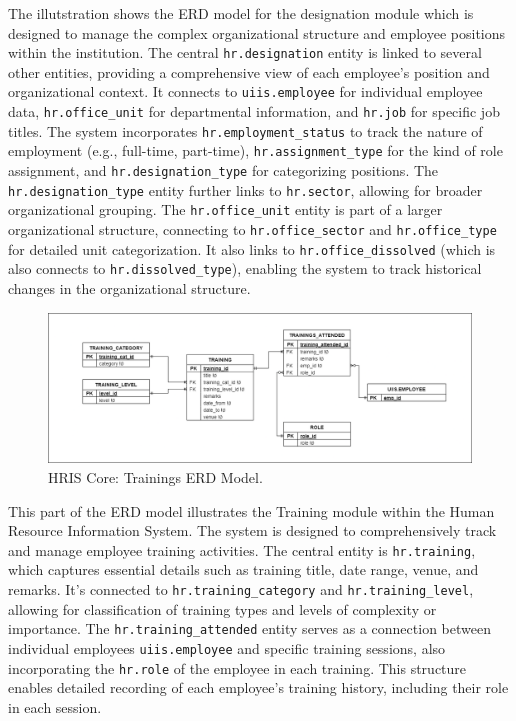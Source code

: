     The illutstration shows the ERD model for the designation module which is designed to manage the complex organizational structure and employee positions within the institution. The central \texttt{hr.designation} entity is linked to several other entities, providing a comprehensive view of each employee's position and organizational context. It connects to \texttt{uiis.employee} for individual employee data, \texttt{hr.office\_unit} for departmental information, and \texttt{hr.job} for specific job titles. The system incorporates \texttt{hr.employment\_status} to track the nature of employment (e.g., full-time, part-time), \texttt{hr.assignment\_type} for the kind of role assignment, and \texttt{hr.designation\_type} for categorizing positions. The \texttt{hr.designation\_type} entity further links to \texttt{hr.sector}, allowing for broader organizational grouping. The \texttt{hr.office\_unit} entity is part of a larger organizational structure, connecting to \texttt{hr.office\_sector} and \texttt{hr.office\_type} for detailed unit categorization. It also links to \texttt{hr.office\_dissolved} (which is also connects to \texttt{hr.dissolved\_type}), enabling the system to track historical changes in the organizational structure.

    \begin{figure}[H]
        \centering
        \includegraphics[width=1\linewidth]{figures/images/diagrams/erd/erd-core-trainings.png}
        \caption{HRIS Core: Trainings ERD Model.}
        \label{fig:erd-core-trainings}
    \end{figure}

    This part of the ERD model illustrates the Training module within the Human Resource Information System. The system is designed to comprehensively track and manage employee training activities. The central entity is \texttt{hr.training}, which captures essential details such as training title, date range, venue, and remarks. It's connected to \texttt{hr.training\_category} and \texttt{hr.training\_level}, allowing for classification of training types and levels of complexity or importance. The \texttt{hr.training\_attended} entity serves as a connection between individual employees \texttt{uiis.employee} and specific training sessions, also incorporating the \texttt{hr.role} of the employee in each training. This structure enables detailed recording of each employee's training history, including their role in each session.

